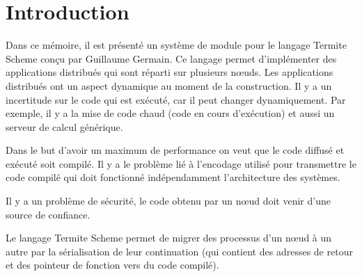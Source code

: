 \chapter*{Introduction}


Dans ce mémoire, il est présenté un système de module pour le langage Termite
Scheme conçu par Guillaume Germain. Ce langage permet d'implémenter des
applications distribués qui sont réparti sur plusieurs nœuds.  Les applications
distribués ont un aspect dynamique au moment de la construction.  Il y a un
incertitude sur le code qui est exécuté, car il peut changer dynamiquement.
Par exemple, il y a la mise de code chaud (code en cours d'exécution) et
aussi un serveur de calcul générique.

Dans le but d'avoir un maximum de performance on veut que le code diffusé et exécuté
soit compilé. Il y a le problème lié à l'encodage utilisé pour transmettre
le code compilé qui doit fonctionné indépendamment l'architecture des systèmes.


Il y a un problème de sécurité, le code obtenu par un nœud doit venir d'une source
de confiance.

Le langage Termite Scheme permet de migrer des processus d'un nœud à un autre
par la sérialisation de leur continuation (qui contient des adresses de retour
et des pointeur de fonction vers du code compilé).






